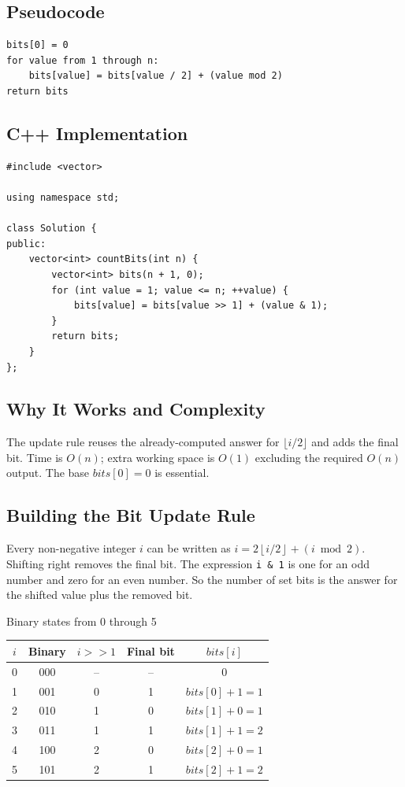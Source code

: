\subsection{Pseudocode}
\begin{lstlisting}[style=pseudocode]
bits[0] = 0
for value from 1 through n:
    bits[value] = bits[value / 2] + (value mod 2)
return bits
\end{lstlisting}

\subsection{C++ Implementation}
\begin{lstlisting}[style=compactcode,caption={Complete C++ solution: Counting Bits}]
#include <vector>

using namespace std;

class Solution {
public:
    vector<int> countBits(int n) {
        vector<int> bits(n + 1, 0);
        for (int value = 1; value <= n; ++value) {
            bits[value] = bits[value >> 1] + (value & 1);
        }
        return bits;
    }
};
\end{lstlisting}

\subsection{Why It Works and Complexity}
The update rule reuses the already-computed answer for \(\lfloor i/2\rfloor\)
and adds the final bit. Time is \(O(n)\); extra working space is \(O(1)\)
excluding the required \(O(n)\) output. The base \(bits[0]=0\) is essential.

\subsection{Building the Bit Update Rule}
Every non-negative integer \(i\) can be written as \(i=2\left\lfloor i/2\right\rfloor +(i\bmod 2).\)
Shifting right removes the final bit. The expression \texttt{i \& 1} is one
for an odd number and zero for an even number. So the number of set
bits is the answer for the shifted value plus the removed bit.

\begin{dryrunbox}{Binary states from 0 through 5}
\begin{center}
\begin{tabular}{@{}c c c c c@{}}
\toprule
\(i\) & Binary & \(i>>1\) & Final bit & \(bits[i]\) \\
\midrule
0 & 000 & -- & -- & 0 \\
1 & 001 & 0 & 1 & \(bits[0]+1=1\) \\
2 & 010 & 1 & 0 & \(bits[1]+0=1\) \\
3 & 011 & 1 & 1 & \(bits[1]+1=2\) \\
4 & 100 & 2 & 0 & \(bits[2]+0=1\) \\
5 & 101 & 2 & 1 & \(bits[2]+1=2\) \\
\bottomrule
\end{tabular}
\end{center}
\end{dryrunbox}

